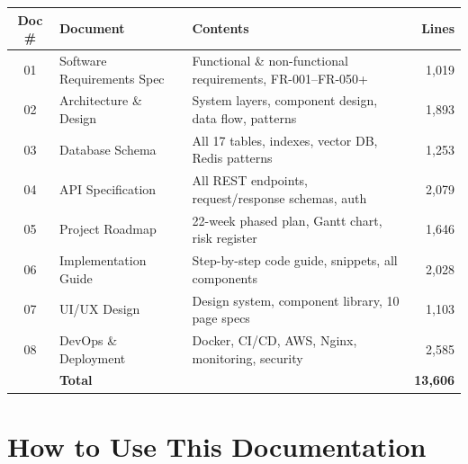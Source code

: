 \documentclass[12pt,a4paper]{report}
\begin{document}
\begin{center}
\begin{tabular}{clp{7cm}r}
\toprule
\textbf{Doc \#} & \textbf{Document} & \textbf{Contents} & \textbf{Lines} \\
\midrule
01 & Software Requirements Spec   & Functional \& non-functional requirements, FR-001--FR-050+ & 1,019 \\
02 & Architecture \& Design       & System layers, component design, data flow, patterns & 1,893 \\
03 & Database Schema              & All 17 tables, indexes, vector DB, Redis patterns & 1,253 \\
04 & API Specification            & All REST endpoints, request/response schemas, auth & 2,079 \\
05 & Project Roadmap              & 22-week phased plan, Gantt chart, risk register & 1,646 \\
06 & Implementation Guide         & Step-by-step code guide, snippets, all components & 2,028 \\
07 & UI/UX Design                 & Design system, component library, 10 page specs & 1,103 \\
08 & DevOps \& Deployment         & Docker, CI/CD, AWS, Nginx, monitoring, security & 2,585 \\
\midrule
   & \textbf{Total}               & & \textbf{13,606} \\
\bottomrule
\end{tabular}
\end{center}

\section*{How to Use This Documentation}
\end{document}
